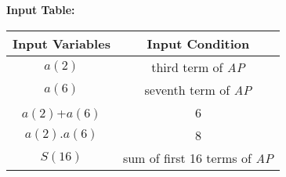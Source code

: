 \documentclass{article}
\begin{document}
\textbf{Input Table:}\\
\begin{center}
\begin{tabular}{|c|c|}  
\hline
     Input Variables & Input Condition \\
\hline
     $a(2)$ & third term of \textit{AP}\\
\hline
     $a(6)$ & seventh term of \textit{AP}\\
\hline
     $a(2)$+$a(6)$ & 6 \\
\hline
     $a(2).a(6)$ & 8 \\
\hline
     $S(16)$ & sum of first 16 terms of \textit{AP}\\
\hline
\end{tabular}
\end{center}
\end{document}
